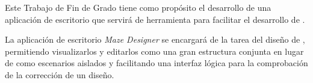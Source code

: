 Este Trabajo de Fin de Grado tiene como propósito el desarrollo de una aplicación de escritorio que servirá de herramienta para facilitar el desarrollo de .

La aplicación de escritorio \textit{Maze Designer} se encargará de la tarea del diseño de , permitiendo visualizarlos y editarlos como una gran estructura conjunta en lugar de como escenarios aislados y facilitando una interfaz lógica para la comprobación de la corrección de un diseño.